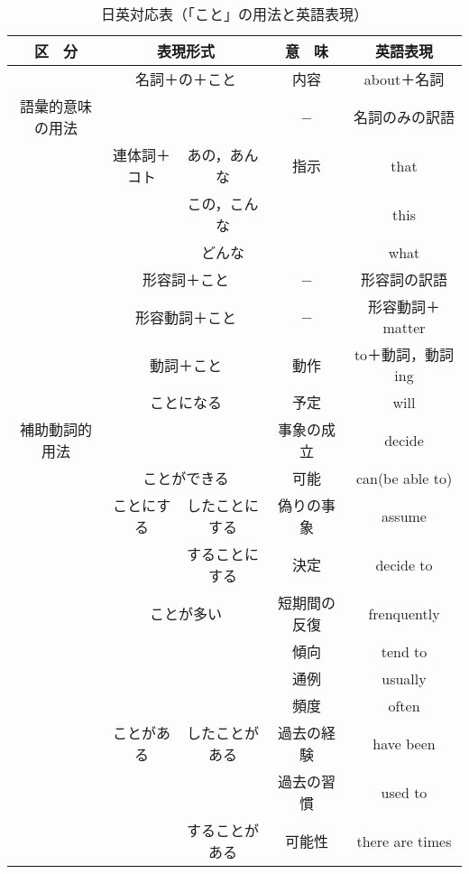 \begin{table}[htbp]
\caption{日英対応表（「こと」の用法と英語表現）}
\begin{center}
\begin{tabular}{|c|c|c|c|c|c|} \hline
区　分 & \multicolumn{3}{|c|}{表現形式} & 意　味 & 英語表現\\ \hline
 & \multicolumn{3}{|c|}{名詞＋の＋こと} & 内容 & about＋名詞\\ \cline{5-6}
語彙的意味の用法 & \multicolumn{3}{|c|}{} & − & 名詞のみの訳語\\ \cline{2-6}
 & \multicolumn{2}{|c|}{連体詞＋コト} & あの，あんな & 指示 & that\\
 \cline{4-4} \cline{6-6}
 & \multicolumn{2}{|c|}{} & この，こんな & & this\\ \cline{4-4}
 \cline{6-6}
 & \multicolumn{2}{|c|}{} & どんな & & what\\ \cline{2-6}
 & \multicolumn{3}{|c|}{形容詞＋こと} & − & 形容詞の訳語\\ \cline{2-6}
 & \multicolumn{3}{|c|}{形容動詞＋こと} & − & 形容動詞＋matter\\ \cline{2-6}
 & \multicolumn{3}{|c|}{動詞＋こと} & 動作 & to＋動詞，動詞ing\\ \hline
 & \multicolumn{3}{|c|}{ことになる} & 予定 & will\\ \cline{5-6}
補助動詞的用法 & \multicolumn{3}{|c|}{} & 事象の成立 & decide\\ \cline{2-6}
 & \multicolumn{3}{|c|}{ことができる} & 可能 & can(be able to)\\ \cline{2-6}
 & ことにする & \multicolumn{2}{|c|}{したことにする} & 偽りの事象 &
 assume\\ \cline{3-6}
 & & \multicolumn{2}{|c|}{することにする} & 決定 & decide to\\ \cline{2-6}
 & \multicolumn{3}{|c|}{ことが多い} & 短期間の反復 & frenquently\\ \cline{5-6}
 & \multicolumn{3}{|c|}{} & 傾向 & tend to\\ \cline{5-6}
 & \multicolumn{3}{|c|}{} & 通例 & usually\\ \cline{5-6}
 & \multicolumn{3}{|c|}{} & 頻度 & often\\ \cline{2-6}
 & ことがある & \multicolumn{2}{|c|}{したことがある} & 過去の経験 & have
 been\\ \cline{5-6}
 & & \multicolumn{2}{|c|}{} & 過去の習慣 & used to\\ \cline{3-6}
 & & \multicolumn{2}{|c|}{することがある} & 可能性 & there are times\\ \cline{5-6}

\end{tabular}
\end{center}
\end{table}
